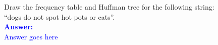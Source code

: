 \item{}
Draw the frequency table and Huffman tree for the following string:\\
``dogs do not spot hot pots or cats''.\\[12pt]
\ifanswers
\textcolor{blue}{
\textbf{Answer:}\\[6pt]
Answer goes here
}
\newpage
\fi
